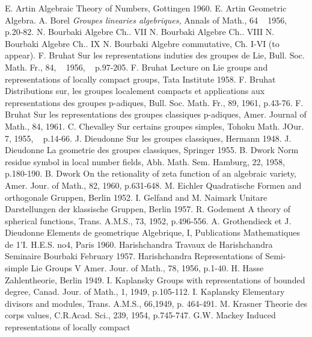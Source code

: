 \begin{thebibliography}{99}
 {E. Artin} Algebraic Theory of Numbers, Gottingen
  1960.\pageoriginale 
{} {E. Artin} Geometric Algebra.
 {A. Borel} \textit{Groupes linearies algebriques,} Annals
  of Math., 64 ~ 1956, p.20-82. 
 {N. Bourbaki} Algebre Ch.. VII
 {N. Bourbaki} Algebre Ch.. VIII
 {N. Bourbaki} Algebre Ch.. IX
 {N. Bourbaki} Algebre commutative, Ch. I-VI (to appear).
 {F. Bruhat} Sur les representations induties des groupes
  de Lie, Bull. Soc. Math. Fr., 84, ~ 1956, ~ p.97-205. 
 {F. Bruhat} Lecture on Lie groups and representations of
  locally compact groups, Tata Institute 1958. 
 {F. Bruhat} Distributions sur, les groupes localement
  compacts et applications aux representations des groupes p-adiques,
  Bull. Soc. Math. Fr., 89, 1961, p.43-76. 
 {F. Bruhat} Sur les representations des groupes
  classiques p-adiques, Amer. Journal of Math., 84, 1961. 
 {C. Chevalley} Sur certains groupes simples, Tohoku
  Math. JOur. 7, 1955, ~ p.14-66. 
 {J. Dieudonne} Sur les groupes classiques, Hermann 1948.
 {J. Dieudonne} La geometrie des groupes classiques,
  Springer 1955. 
 {B. Dwork} Norm residue symbol in local number fields,
  Abh. Math. Sem. Hamburg, 22, 1958, p.180-190. 
 {B. Dwork} On the retionality of zeta function of an
  algebraic variety, Amer. Jour. of Math., 82, 1960, p.631-648. 
 {M. Eichler} Quadratische Formen and orthogonale
  Gruppen, Berlin 1952. 
 {I. Gelfand and M. Naimark} Unitare Darstellungen der
  klassische Gruppen, Berlin 1957. 
 {R. Godement} A theory of spherical functions,
  Trans. A.M.S., 73, 1952, p.496-556. 
 {A. Grothendieck et J. Dieudonne} Elements de
  geometrique Algebrique, I, Publications Mathematiques de
  1'I. H.E.S. no4, Paris 1960.\pageoriginale 
{} {Harishchandra} Travaux de Harishchandra Seminaire
  Bourbaki February 1957. 
 {Harishchandra} Representations of Semi-simple Lie
  Groups V Amer. Jour. of Math., 78, 1956, p.1-40. 
 {H. Hasse} Zahlentheorie, Berlin 1949.
 {I. Kaplansky} Groups with representations of bounded
  degree, Canad. Jour. of Math., 1, 1949, p.105-112. 
 {I. Kaplansky} Elementary divisors and modules,
  Trans. A.M.S., 66,1949, p. 464-491. 
 {M. Krasner} Theorie des corps values, C.R.Acad. Sci.,
  239, 1954, p.745-747. 
 {G.W. Mackey} Induced representations of locally compact

\end{thebibliography}
